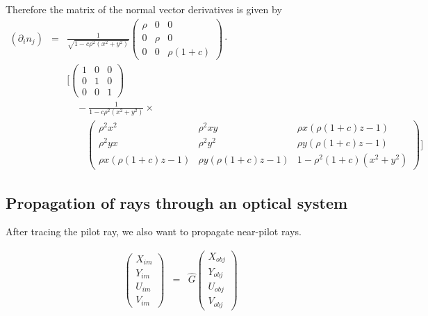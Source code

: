 \documentclass[12pt,a4paper,twoside,openright,BCOR10mm,headsepline,titlepage,abstracton,chapterprefix,final]{scrreprt}
\newcommand\Vector[1]{{\mathbf{#1}}}
\begin{document}
Therefore the matrix of the normal vector derivatives is given by
\begin{eqnarray}
 (\partial_i n_j) &=& \frac{1}{\sqrt{ 1 - c \rho^2 (x^2 + y^2)}}
\begin{pmatrix}
  \rho & 0 & 0 \\
  0 & \rho & 0 \\
  0 & 0 & \rho(1+c)
\end{pmatrix}\cdot\nonumber\\
&&
\biggl[
\begin{pmatrix}
 1 & 0 & 0 \\
 0 & 1 & 0 \\
 0 & 0 & 1
\end{pmatrix}\nonumber\\
&&\quad
- \frac{1}{1 - c \rho^2 (x^2 + y^2)}\times\nonumber\\
&&\quad\quad
\begin{pmatrix}
 \rho^2 x^2 & \rho^2 x y & \rho x (\rho (1+c) z - 1) \\
 \rho^2 y x & \rho^2 y^2 & \rho y (\rho (1+c) z - 1) \\
 \rho x (\rho (1+c) z - 1) & \rho y (\rho (1+c) z - 1) & 1-\rho^2 (1+c) (x^2+y^2)%
\end{pmatrix}
\biggr]
\end{eqnarray}




\subsection{Propagation of rays through an optical system}

After tracing the pilot ray, we also want to propagate near-pilot rays.

\begin{eqnarray}
 \begin{pmatrix}
  X_{im} \\ Y_{im} \\ U_{im} \\ V_{im}
 \end{pmatrix}
 &=&
 \hat{G}
 \begin{pmatrix}
  X_{obj} \\ Y_{obj} \\ U_{obj} \\ V_{obj}
 \end{pmatrix}
\end{eqnarray}
\end{document}
